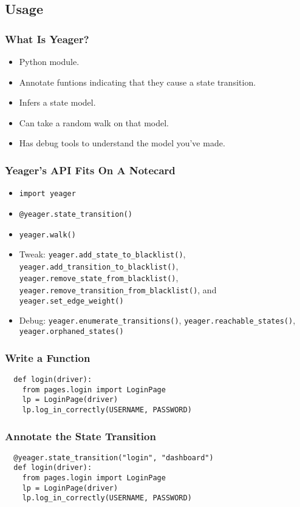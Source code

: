 \subsection{Usage}

\begin{frame}
  \frametitle{What Is Yeager?}
  \begin{itemize}
    \item Python module.
    \item Annotate funtions indicating that they cause a state transition.
    \item Infers a state model.
    \item Can take a random walk on that model.
    \item Has debug tools to understand the model you've made.
  \end{itemize}
\end{frame}

\begin{frame}
  \frametitle{Yeager's API Fits On A Notecard}
  \begin{itemize}
    \item \texttt{import yeager}
    \item \texttt{@yeager.state\_transition()}
    \item \texttt{yeager.walk()}
    \item Tweak: \texttt{yeager.add\_state\_to\_blacklist()}, \texttt{yeager.add\_transition\_to\_blacklist()}, \texttt{yeager.remove\_state\_from\_blacklist()}, \texttt{yeager.remove\_transition\_from\_blacklist()}, and \texttt{yeager.set\_edge\_weight()}
    \item Debug: \texttt{yeager.enumerate\_transitions()}, \texttt{yeager.reachable\_states()}, \texttt{yeager.orphaned\_states()}
  \end{itemize}
\end{frame}

\begin{frame}[fragile]
  \frametitle{Write a Function}
  \begin{lstlisting}
  def login(driver):
    from pages.login import LoginPage
    lp = LoginPage(driver)
    lp.log_in_correctly(USERNAME, PASSWORD)
  \end{lstlisting}
\end{frame}

\begin{frame}[fragile]
  \frametitle{Annotate the State Transition}
  \begin{lstlisting}
  @yeager.state_transition("login", "dashboard")
  def login(driver):
    from pages.login import LoginPage
    lp = LoginPage(driver)
    lp.log_in_correctly(USERNAME, PASSWORD)
  \end{lstlisting}
\end{frame}

